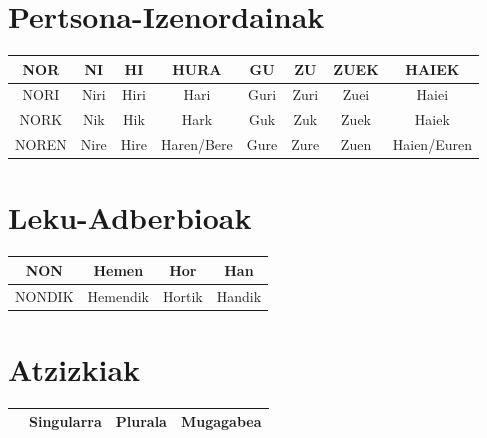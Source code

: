 \documentclass[12pt]{article}
\begin{document}
\section{Pertsona-Izenordainak}
\begin{table}[h]
\begin{center}
\begin{tabular}{|c|c|c|c|c|c|c|c|}
\hline
NOR & NI & HI & HURA & GU & ZU & ZUEK & HAIEK \\ 
\hline
NORI & Niri & Hiri & Hari & Guri & Zuri & Zuei & Haiei \\
\hline
NORK & Nik & Hik & Hark & Guk & Zuk & Zuek & Haiek \\
\hline
NOREN & Nire & Hire & Haren/Bere & Gure & Zure & Zuen & Haien/Euren \\
\hline
\end{tabular}
\end{center}
\end{table}
\newpage

\section{Leku-Adberbioak}
\begin{table}[h]
\begin{center}
\begin{tabular}{|c|c|c|c|}
\hline
NON & Hemen & Hor & Han \\
\hline
NONDIK & Hemendik & Hortik & Handik \\
\hline
\end{tabular}
\end{center}
\end{table}
\newpage

\section{Atzizkiak}
\begin{table}[h]
\begin{center}
\begin{tabular}{|c|c|c|c|}
\hline
& Singularra & Plurala & Mugagabea \\
\hline

\end{tabular}
\end{center}
\end{table}
\newpage
\end{document}
